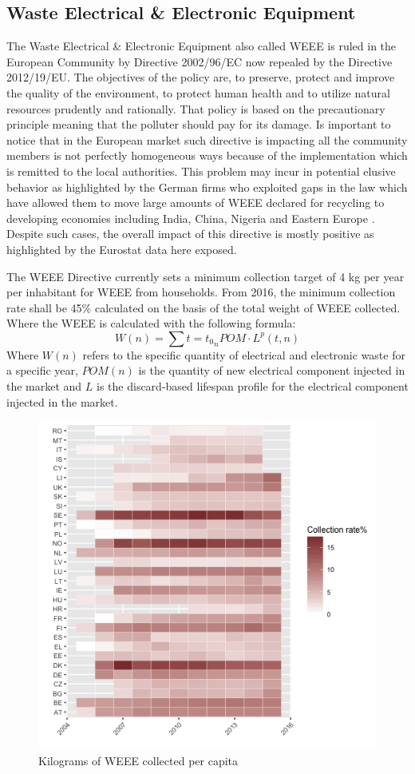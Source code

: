 \documentclass{article}
\begin{document}
\subsection{Waste Electrical \& Electronic Equipment}
  The Waste Electrical \& Electronic Equipment also called WEEE is ruled in the European Community by Directive 2002/96/EC now repealed by the Directive 2012/19/EU. The objectives of the policy are, to preserve, protect and improve the quality of the environment, to protect human health and to utilize natural resources prudently and rationally. That policy is based on the precautionary principle meaning that the polluter should pay for its damage. Is important to notice that in the European market such directive is impacting all the community members is not perfectly homogeneous ways because of the implementation which is remitted to the local authorities. This problem may incur in potential elusive behavior as highlighted by the German firms who exploited gaps in the law which have allowed them to move large amounts of WEEE declared for recycling to developing economies including India, China, Nigeria and Eastern Europe \cite{ongondo_how_2011}. Despite such cases, the overall impact of this directive is mostly positive as highlighted by the Eurostat data here exposed.

  The WEEE Directive currently sets a minimum collection target of 4 kg per year per inhabitant for WEEE from households. From 2016, the minimum collection rate shall be 45\% calculated on the basis of the total weight of WEEE collected. Where the WEEE is calculated with the following formula:
  $$
  W (n) = \sum{t = t_0}_{n} POM \cdot L^p(t,n)
  $$
  Where $W(n)$ refers to the specific quantity of electrical and electronic waste for a specific year, $POM(n)$ is the quantity of new electrical component injected in the market and $L$ is the discard-based lifespan profile for the electrical component injected in the market.

  \begin{figure}
  \centering
  \includegraphics[width=0.5\linewidth]{Images/heatmap.png}
  \caption{Kilograms of WEEE collected per capita}
  \end{figure}
\end{document}
